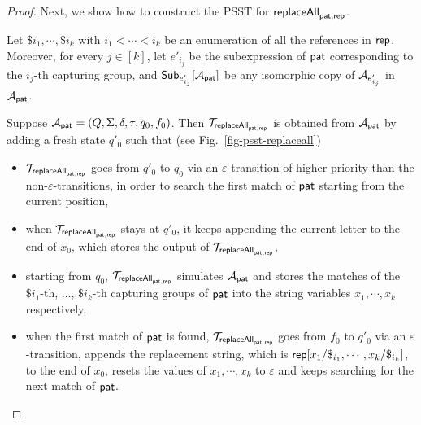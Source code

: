 \begin{proof}


        Next, we show how to construct the PSST for $\mathsf{replaceAll}_{\mathsf{pat}, \mathsf{rep}}$. 

        Let $\$i_1, \cdots, \$i_k$ with $i_1 < \cdots < i_k$ be an enumeration of all the references in $\mathsf{rep}$. 
        Moreover, for every $j \in [k]$, let $e'_{i_j}$ be the subexpression of $\mathsf{pat}$ corresponding to the $i_j$-th capturing group, and ${\sf Sub}_{e'_{i_j}}[\mathcal{A}_{\mathsf{pat}}]$ be any isomorphic copy of $\mathcal{A}_{e'_{i_j}}$ in $\mathcal{A}_{\mathsf{pat}}$.

        Suppose $\mathcal{A}_{\mathsf{pat}} = (Q, \Sigma, \delta, \tau, q_0, f_0)$. Then $\mathcal{T}_{\mathsf{replaceAll}_{\mathsf{pat},\mathsf{rep}}}$ is obtained from $\mathcal{A}_{\mathsf{pat}}$ by adding a fresh state $q'_0$ such that (see Fig.~\ref{fig-psst-replaceall})
        \begin{itemize}
            \item $\mathcal{T}_{\mathsf{replaceAll}_{\mathsf{pat},\mathsf{rep}}}$ goes from $q'_0$ to $q_0$ via an $\varepsilon$-transition of higher priority than the non-$\varepsilon$-transitions, in order to search the first match of $\mathsf{pat}$ starting from the current position, 
            \item when $\mathcal{T}_{\mathsf{replaceAll}_{\mathsf{pat},\mathsf{rep}}}$ stays at $q'_0$, it keeps appending the current letter to the end of $x_0$, which stores the output of $\mathcal{T}_{\mathsf{replaceAll}_{\mathsf{pat},\mathsf{rep}}}$,
            \item starting from $q_0$, $\mathcal{T}_{\mathsf{replaceAll}_{\mathsf{pat},\mathsf{rep}}}$ simulates $\mathcal{A}_{\mathsf{pat}}$ and stores the matches of the $\$i_1$-th, $\ldots$, $\$i_k$-th capturing groups of $\mathsf{pat}$ into the string variables $x_1, \cdots, x_k$ respectively,   
            \item when the first match of $\mathsf{pat}$ is found, $\mathcal{T}_{\mathsf{replaceAll}_{\mathsf{pat},\mathsf{rep}}}$ goes from $f_0$ to $q'_0$ via an $\varepsilon$-transition, appends the replacement string, which is $\mathsf{rep}[x_1/\$_{i_1}, \cdots, x_k/\$_{i_k}]$, to the end of $x_0$, resets the values of $x_1,\cdots,x_k$ to $\varepsilon$ and keeps searching for the next match of $\mathsf{pat}$.
        \end{itemize}


\end{proof}
